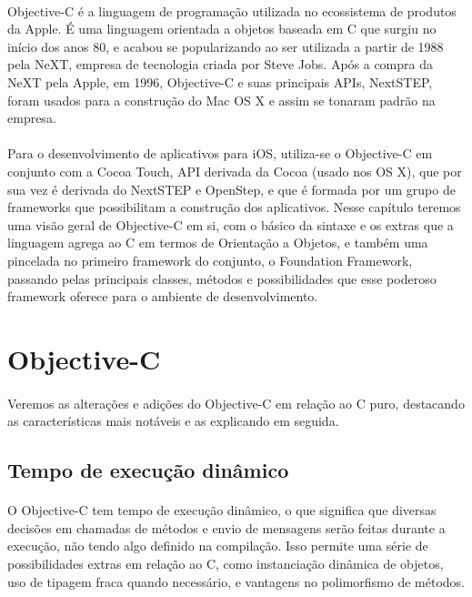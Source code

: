 \documentclass[a4paper,12pt,brazil,doubleside]{book}
\begin{document}
\paragraph{}Objective-C é a linguagem de programação utilizada no ecossistema de produtos da Apple. É uma linguagem orientada a objetos baseada em C que surgiu no início dos anos 80, e acabou se popularizando ao ser utilizada a partir de 1988 pela NeXT, empresa de tecnologia criada por Steve Jobs. Após a compra da NeXT pela Apple, em 1996, Objective-C e suas principais APIs, NextSTEP, foram usados para a construção do Mac OS X e assim se tonaram padrão na empresa.
\paragraph{}Para o desenvolvimento de aplicativos para iOS, utiliza-se o Objective-C em conjunto com a Cocoa Touch, API derivada da Cocoa (usado nos OS X), que por sua vez é derivada do NextSTEP e OpenStep, e que é formada por um grupo de frameworks que possibilitam a construção dos aplicativos. Nesse capítulo teremos uma visão geral de Objective-C em si, com o básico da sintaxe e os extras que a linguagem agrega ao C em termos de Orientação a Objetos, e também uma pincelada no primeiro framework do conjunto, o Foundation Framework, passando pelas principais classes, métodos e possibilidades que esse poderoso framework oferece para o ambiente de desenvolvimento.

\bigskip 
\bigskip


\section{Objective-C}

\paragraph{}Veremos as alterações e adições do Objective-C em relação ao C puro, destacando as características mais notáveis e as explicando em seguida.

\bigskip 
\bigskip

\subsection{Tempo de execução dinâmico}

\paragraph{}O Objective-C tem tempo de execução dinâmico, o que significa que diversas decisões em chamadas de métodos e envio de mensagens serão feitas durante a execução, não tendo algo definido na compilação. Isso permite uma série de possibilidades extras em relação ao C, como instanciação dinâmica de objetos, uso de tipagem fraca quando necessário, e vantagens no polimorfismo de métodos.
\end{document}
